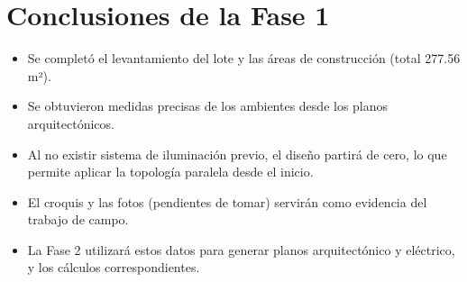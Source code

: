 \section{Conclusiones de la Fase 1}
\begin{itemize}
    \item Se completó el levantamiento del lote y las áreas de construcción (total 277.56 m²).
    \item Se obtuvieron medidas precisas de los ambientes desde los planos arquitectónicos.
    \item Al no existir sistema de iluminación previo, el diseño partirá de cero, lo que permite aplicar la topología paralela desde el inicio.
    \item El croquis y las fotos (pendientes de tomar) servirán como evidencia del trabajo de campo.
    \item La Fase 2 utilizará estos datos para generar planos arquitectónico y eléctrico, y los cálculos correspondientes.
\end{itemize}

